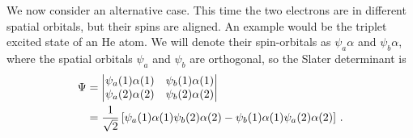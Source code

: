 \documentclass{article}
\theoremstyle{plain}\theoremheaderfont{\normalfont\itshape}\theorembodyfont{\rmfamily}\theoremseparator{.}\newtheorem*{rem}{Remark}\newtheorem*{ex}{Example}\newtheorem*{proof}{Proof}\newtheorem*{altp}{Alternative proof}
\theoremstyle{plain}\theoremheaderfont{\normalfont\bfseries}\theorembodyfont{\rmfamily}\theoremseparator{.}\newtheorem{thm}{Theorem}[section]\newtheorem{lem}[thm]{Lemma}\newtheorem{prop}[thm]{Proposition}\newtheorem*{cor}{Corollary}\newtheorem{defn}[thm]{Definition}\newtheorem{clm}[thm]{Claim}\newtheorem{clminproof}{Claim}\newtheorem{pos}{Postulate}[section]
\theoremstyle{break}\theoremheaderfont{\normalfont\itshape}\theorembodyfont{\rmfamily}\theoremseparator{.\medskip}\newtheorem*{proofskip}{Proof}\newtheorem*{exs}{Examples}\newtheorem*{rems}{Remarks}
\theoremstyle{break}\theoremheaderfont{\normalfont\bfseries}\theorembodyfont{\rmfamily}\theoremseparator{.\medskip}\newtheorem{lemskip}[thm]{Lemma}\newtheorem{defnskip}[thm]{Definition}\newtheorem{propskip}[thm]{Proposition}\newtheorem{thmskip}[thm]{Theorem}
\numberwithin{equation}{section}
\begin{document}
    We now consider an alternative case. This time the two electrons are in different spatial orbitals, but their spins are aligned. An example would be the triplet excited state of an \(\mathrm{He}\) atom. We will denote their spin-orbitals as \(\psi_a\alpha\) and \(\psi_b\alpha\), where the spatial orbitals \(\psi_a\) and \(\psi_b\) are orthogonal, so the Slater determinant is
    \begin{align}
        \Psi&=\begin{vmatrix}
            \psi_a(1)\alpha(1) & \psi_b(1)\alpha(1) \\
            \psi_a(2)\alpha(2) & \psi_b(2)\alpha(2)
        \end{vmatrix}\notag\\
        &=\frac{1}{\sqrt{2}}\left[\psi_a(1)\alpha(1)\psi_b(2)\alpha(2)-\psi_b(1)\alpha(1)\psi_a(2)\alpha(2)\right]\,.
    \end{align}

    \begin{figure}
        \centering
    \end{figure}
\end{document}
